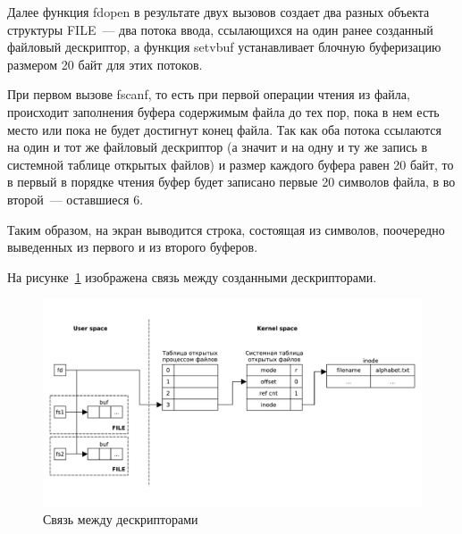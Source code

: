 Далее функция fdopen в результате двух вызовов создает два разных объекта структуры FILE~--- два потока ввода, ссылающихся на один ранее созданный файловый дескриптор, а функция setvbuf устанавливает блочную буферизацию размером 20 байт для этих потоков.

При первом вызове fscanf, то есть при первой операции чтения из файла, происходит заполнения буфера содержимым файла до тех пор, пока в нем есть место или пока не будет достигнут конец файла. Так как оба потока ссылаются на один и тот же файловый дескриптор (а значит и на одну и ту же запись в системной таблице открытых файлов) и размер каждого буфера равен 20 байт, то в первый в порядке чтения буфер будет записано первые 20 символов файла, в во второй~--- оставшиеся 6.

Таким образом, на экран выводится строка, состоящая из символов, поочередно выведенных из первого и из второго буферов.

На рисунке~\ref{pdf:task01} изображена связь между созданными дескрипторами.

\begin{figure}[H]
    \centering
    \includegraphics[scale=0.5]{pdf/task01.pdf}
    \caption{Связь между дескрипторами}\label{pdf:task01}
\end{figure}

